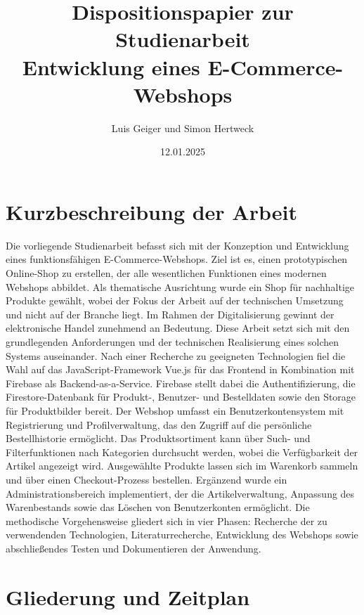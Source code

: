 \documentclass{scrartcl}
\title{Dispositionspapier zur Studienarbeit\\Entwicklung eines E-Commerce-Webshops}
\author{Luis Geiger und Simon Hertweck}
\date{12.01.2025}
\begin{document}
\maketitle

\section{Kurzbeschreibung der Arbeit}
Die vorliegende Studienarbeit befasst sich mit der Konzeption und Entwicklung eines funktionsfähigen E-Commerce-Webshops. Ziel ist es, einen prototypischen Online-Shop zu erstellen, der alle wesentlichen Funktionen eines modernen Webshops abbildet. Als thematische Ausrichtung wurde ein Shop für nachhaltige Produkte gewählt, wobei der Fokus der Arbeit auf der technischen Umsetzung und nicht auf der Branche liegt.
\newline
\newline
Im Rahmen der Digitalisierung gewinnt der elektronische Handel zunehmend an Bedeutung. Diese Arbeit setzt sich mit den grundlegenden Anforderungen und der technischen Realisierung eines solchen Systems auseinander. Nach einer Recherche zu geeigneten Technologien fiel die Wahl auf das JavaScript-Framework Vue.js für das Frontend in Kombination mit Firebase als Backend-as-a-Service. Firebase stellt dabei die Authentifizierung, die Firestore-Datenbank für Produkt-, Benutzer- und Bestelldaten sowie den Storage für Produktbilder bereit.
\newline
\newline
Der Webshop umfasst ein Benutzerkontensystem mit Registrierung und Profilverwaltung, das den Zugriff auf die persönliche Bestellhistorie ermöglicht. Das Produktsortiment kann über Such- und Filterfunktionen nach Kategorien durchsucht werden, wobei die Verfügbarkeit der Artikel angezeigt wird. Ausgewählte Produkte lassen sich im Warenkorb sammeln und über einen Checkout-Prozess bestellen. Ergänzend wurde ein Administrationsbereich implementiert, der die Artikelverwaltung, Anpassung des Warenbestands sowie das Löschen von Benutzerkonten ermöglicht.
\newline
\newline
Die methodische Vorgehensweise gliedert sich in vier Phasen: Recherche der zu verwendenden Technologien, Literaturrecherche, Entwicklung des Webshops sowie abschließendes Testen und Dokumentieren der Anwendung.


\newpage
\section{Gliederung und Zeitplan}
\end{document}
